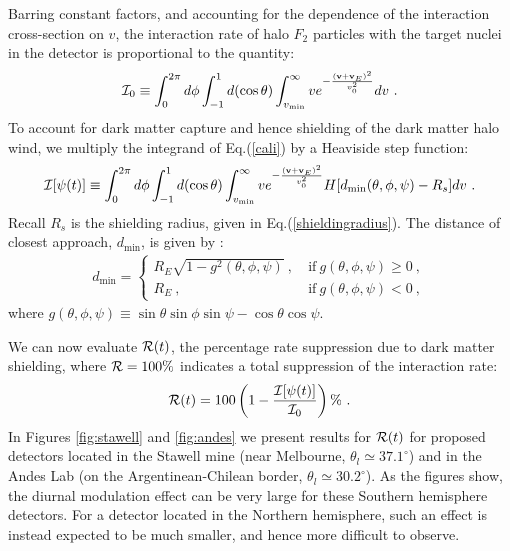 \documentclass[12pt]{article}
\begin{document}
Barring constant factors, and accounting for the dependence of the interaction cross-section on $v$, the interaction rate of halo $F_2$ particles with the target nuclei in the detector is proportional to the quantity:
%
\begin{eqnarray}
{\cal I} _0 \equiv \int _0 ^{2\pi} d\phi \int _{-1} ^{1} d(\cos \theta) \int _{v _{\min}} ^{\infty} ve ^{-\frac{(\mathbf{v} + \mathbf{v} _E) ^2}{v _0 ^2}} dv \ .
\label{cali}
\end{eqnarray}
%
To account for dark matter capture and hence shielding of the dark matter halo wind, we multiply the integrand of Eq.(\ref{cali}) by a Heaviside step function:
%
\begin{eqnarray}
{\cal I}[\psi (t)] \equiv \int _0 ^{2\pi} d\phi \int _{-1} ^{1} d(\cos \theta) \int _{v _{\min}} ^{\infty} ve ^{-\frac{(\mathbf{v} + \mathbf{v} _E) ^2}{v _0 ^2}} H[d _{\min}(\theta , \phi , \psi) - R _s] dv \ .
\label{ipsit}
\end{eqnarray}
%
Recall $R _s$ is the shielding radius, given in Eq.(\ref{shieldingradius}). The distance of closest approach, $d _{\min}$, is given by \cite{footdiurnal}:
%
\begin{eqnarray}
d _{\min} = \begin{cases}
            R _E\sqrt{1 - g ^2(\theta , \phi , \psi)} \ , \ & \text{if} \ g(\theta, \phi , \psi) \geq 0 \ , \\
            R _E \ , \ & \text{if} \ g(\theta , \phi , \psi) < 0 \ ,
            \end{cases}
\end{eqnarray}
%
where $g(\theta , \phi , \psi) \equiv \sin \theta \sin \phi \sin \psi - \cos \theta \cos \psi$.

We can now evaluate ${\cal R}(t)$, the percentage rate suppression due to dark matter shielding, where ${\cal R} = 100 \%$ indicates a total suppression of the interaction rate:
%
\begin{eqnarray}
{\cal R}(t) = 100\left (1 - \frac{{\cal I}[\psi (t)]}{{\cal I} _0} \right ) \% \ .
\label{calr}
\end{eqnarray}
%
In Figures \ref{fig:stawell} and \ref{fig:andes} we present results for ${\cal R}(t)$ for proposed detectors located in the Stawell mine (near Melbourne, $\theta _l \simeq 37.1 ^{\circ}$) and in the Andes Lab (on the Argentinean-Chilean border, $\theta _l \simeq 30.2 ^{\circ}$). As the figures show, the diurnal modulation effect can be very large for these Southern hemisphere detectors. For a detector located in the Northern hemisphere, such an effect is instead expected to be much smaller, and hence more difficult to observe.
\end{document}

